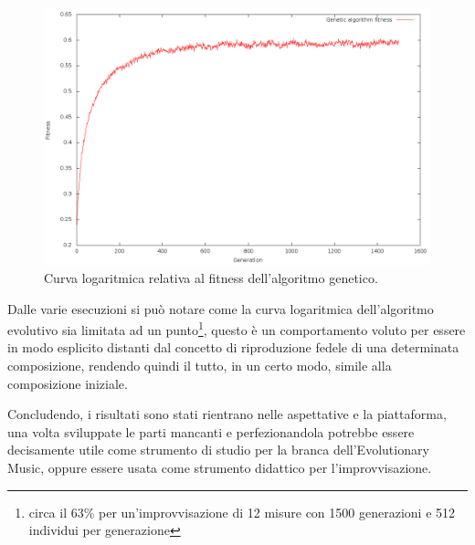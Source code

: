 \begin{figure}[H]
\centering
\includegraphics[width=\textwidth]{img/logcurve.png}
\caption{Curva logaritmica relativa al fitness dell'algoritmo genetico.}
\end{figure}
Dalle varie esecuzioni si può notare come la curva logaritmica dell'algoritmo
evolutivo sia limitata ad un punto\footnote{circa il 63\% per un'improvvisazione
di 12 misure con 1500 generazioni e 512 individui per generazione},
questo è un comportamento voluto
per essere in modo esplicito distanti dal concetto di riproduzione fedele di una
determinata composizione, rendendo quindi il tutto, in un certo modo,
simile alla composizione iniziale.

Concludendo, i risultati sono stati rientrano nelle aspettative e la piattaforma,
una volta sviluppate le parti mancanti e perfezionandola potrebbe essere decisamente utile
come strumento di studio per la branca dell'Evolutionary Music, oppure
essere usata come strumento didattico per l'improvvisazione.

